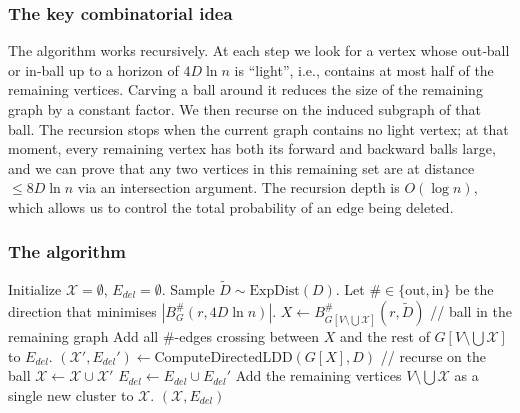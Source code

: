 \subsubsection{The key combinatorial idea}
The algorithm works recursively. At each step we look for a vertex whose out‑ball or in‑ball up to a horizon of $4D\ln n$ is ``light'', i.e., contains at most half of the remaining vertices. Carving a ball around it reduces the size of the remaining graph by a constant factor. We then recurse on the induced subgraph of that ball. The recursion stops when the current graph contains no light vertex; at that moment, every remaining vertex has both its forward and backward balls large, and we can prove that any two vertices in this remaining set are at distance $\le 8D\ln n$ via an intersection argument. The recursion depth is $O(\log n)$, which allows us to control the total probability of an edge being deleted.

\subsubsection{The algorithm}

\begin{algorithm}
\caption{ComputeDirectedLDD($G, D$)}\label{alg:computeDirLDD}
\begin{algorithmic}
\State Initialize $\mathcal{X} = \emptyset$, $E_{del} = \emptyset$.
    \State Sample $\tilde{D} \sim \text{ExpDist}(D)$.
    \State Let $\# \in \{\mathrm{out}, \mathrm{in}\}$ be the direction that minimises $|B^{\#}_G(r, 4D\ln n)|$.
    \State $X \gets B^{\#}_{G[V\setminus \bigcup \mathcal{X}]}(r, \tilde{D})$ \hfill // ball in the remaining graph
    \State Add all $\#$-edges crossing between $X$ and the rest of $G[V\setminus \bigcup \mathcal{X}]$ to $E_{del}$.
    \State $(\mathcal{X}', E_{del}') \gets \text{ComputeDirectedLDD}(G[X], D)$ \hfill // recurse on the ball
    \State $\mathcal{X} \gets \mathcal{X} \cup \mathcal{X}'$
    \State $E_{del} \gets E_{del} \cup E_{del}'$
\EndWhile
\State Add the remaining vertices $V \setminus \bigcup \mathcal{X}$ as a single new cluster to $\mathcal{X}$.
\State \Return $(\mathcal{X}, E_{del})$
\end{algorithmic}
\end{algorithm}

